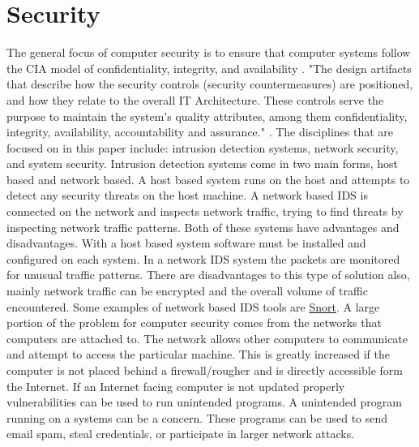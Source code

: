 \documentclass[12pt]{article}
\begin{document}
\section{Security}
The general focus of computer security is to ensure that computer systems follow the CIA model of confidentiality, integrity, and availability \cite{krutz2010cloud}. "The design artifacts that describe how the security controls (security countermeasures) are positioned, and how they relate to the overall IT Architecture. These controls serve the purpose to maintain the system's quality attributes, among them confidentiality, integrity, availability, accountability and assurance." \cite{krutz2010cloud}. The disciplines that are focused on in this paper include: intrusion detection systems, network security, and system security.
Intrusion detection systems come in two main forms, host based and network based. A host based system runs on the host and attempts to detect any security threats on the host machine. A network based IDS is connected on the network and inspects network traffic, trying to find threats by inspecting network traffic patterns. Both of these systems have advantages and disadvantages. With a host based system software must be installed and configured on each system. In a network IDS system the packets are monitored for unusual traffic patterns. There are disadvantages to this type of solution also, mainly network traffic can be encrypted and the overall volume of traffic encountered. Some examples of network based IDS tools are \href{https://www.snort.org/}{Snort}.
A large portion of the problem for computer security comes from the networks that computers are attached to. The network allows other computers to communicate and attempt to access the particular machine. This is greatly increased if the computer is not placed behind a firewall/rougher and is directly accessible form the Internet. If an Internet facing computer is not updated properly vulnerabilities can be used to run unintended programs.
A unintended program running on a systems can be a concern. These programs can be used to send email spam, steal credentials, or participate in larger network attacks.

\end{document}
